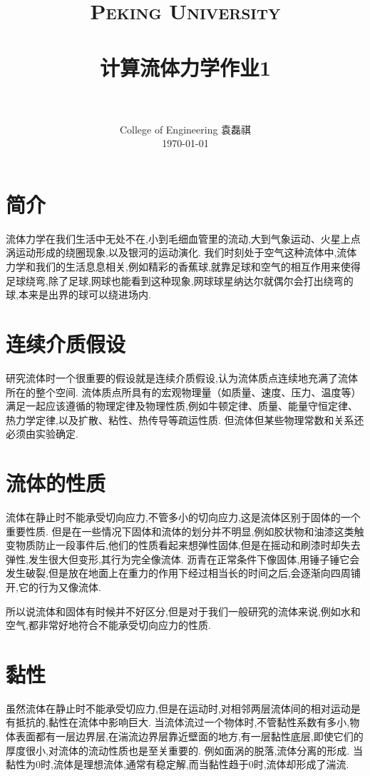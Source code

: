 \documentclass[12pt]{article}
\title{
		\vspace{-1in} 	
		\usefont{OT1}{bch}{b}{n}
		\normalfont \normalsize \textsc{\LARGE Peking University}\\[1cm] %
		\horrule{0.5pt} \\[0.5cm]
		\huge \bfseries{计算流体力学作业1} \\
		\horrule{2pt} \\[0.5cm]
}
\author{
		\normalfont 								\normalsize
		College of Engineering \quad 2001111690  \quad 袁磊祺\\	\normalsize
        \today
}
\date{}
\begin{document}


\maketitle

\section{简介}

流体力学在我们生活中无处不在,小到毛细血管里的流动,大到气象运动、火星上点涡运动形成的绕圈现象,以及银河的运动演化. 我们时刻处于空气这种流体中,流体力学和我们的生活息息相关,例如精彩的香蕉球,就靠足球和空气的相互作用来使得足球绕弯,除了足球,网球也能看到这种现象,网球球星纳达尔就偶尔会打出绕弯的球,本来是出界的球可以绕进场内. 

\section{连续介质假设}

研究流体时一个很重要的假设就是连续介质假设,认为流体质点连续地充满了流体所在的整个空间. 流体质点所具有的宏观物理量（如质量、速度、压力、温度等）满足一起应该遵循的物理定律及物理性质,例如牛顿定律、质量、能量守恒定律、热力学定律,以及扩散、粘性、热传导等疏运性质. 但流体但某些物理常数和关系还必须由实验确定. 


\section{流体的性质}


流体在静止时不能承受切向应力,不管多小的切向应力,这是流体区别于固体的一个重要性质. 但是在一些情况下固体和流体的划分并不明显,例如胶状物和油漆这类触变物质防止一段事件后,他们的性质看起来想弹性固体,但是在摇动和刷漆时却失去弹性,发生很大但变形,其行为完全像流体. 沥青在正常条件下像固体,用锤子锤它会发生破裂,但是放在地面上在重力的作用下经过相当长的时间之后,会逐渐向四周铺开,它的行为又像流体. 

所以说流体和固体有时候并不好区分,但是对于我们一般研究的流体来说,例如水和空气,都非常好地符合不能承受切向应力的性质. 

\section{黏性}

虽然流体在静止时不能承受切应力,但是在运动时,对相邻两层流体间的相对运动是有抵抗的,黏性在流体中影响巨大. 当流体流过一个物体时,不管黏性系数有多小,物体表面都有一层边界层,在湍流边界层靠近壁面的地方,有一层黏性底层,即使它们的厚度很小,对流体的流动性质也是至关重要的. 例如面涡的脱落,流体分离的形成. 当黏性为0时,流体是理想流体,通常有稳定解,而当黏性趋于0时,流体却形成了湍流. 
\end{document}
